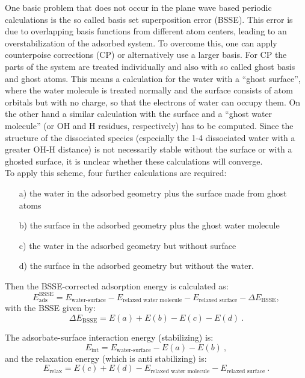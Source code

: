 \documentclass[11pt,DIV=13,BCOR=5mm,a4paper,headinclude]{scrbook}
\begin{document}
One basic problem that does not occur in the plane wave based periodic calculations is the so called basis set superposition error (BSSE).
This error is due to overlapping basis functions from different atom centers, leading to an overstabilization of the adsorbed system.
To overcome this, one can apply counterpoise corrections (CP)\cite{Boys1970} or alternatively use a larger basis.
For CP the parts of the system are treated individually and also with so called ghost basis and ghost atoms.
This means a calculation for the water with a ``ghost surface'', where the water molecule is treated normally and the surface consists of atom orbitals but with no charge, so that the electrons of water can occupy them.
On the other hand a similar calculation with the surface and a ``ghost water molecule'' (or OH and H residues, respectively) has to be computed.
Since the structure of the dissociated species (especially the 1-4 dissociated water with a greater OH-H distance) is not necessarily stable without the surface or with a ghosted surface, it is unclear whether these calculations will converge.
\\

To apply this scheme, four further calculations are required:
\begin{itemize}
 \item[a)] the water in the adsorbed geometry plus the surface made from ghost atoms
 \item[b)] the surface in the adsorbed geometry plus the ghost water molecule
 \item[c)] the water in the adsorbed geometry but without surface
 \item[d)] the surface in the adsorbed geometry but without the water.
\end{itemize}

Then the BSSE-corrected adsorption energy is calculated as:
\begin{equation}\label{eq:BSSEcorr}
E_\textrm{ads}^\textrm{BSSE}=E_{\textrm{water-surface}}-E_{\textrm{relaxed water molecule}}-E_{\textrm{relaxed surface}}-\Delta E_\textrm{BSSE},
\end{equation}
with the BSSE given by:
\begin{equation}
 \Delta E_\textrm{BSSE}=E(a)+E(b)-E(c)-E(d) ~.
\end{equation}

The adsorbate-surface interaction energy (stabilizing) is:
\begin{equation}
 E_\textrm{int}=E_{\textrm{water-surface}}-E(a)-E(b) ~,
\end{equation}
and the relaxation energy (which is anti stabilizing) is:
\begin{equation}\label{eq:relaxE}
 E_\textrm{relax}=E(c)+E(d)-E_{\textrm{relaxed water molecule}}-E_{\textrm{relaxed surface}} ~.
\end{equation}
\end{document}
